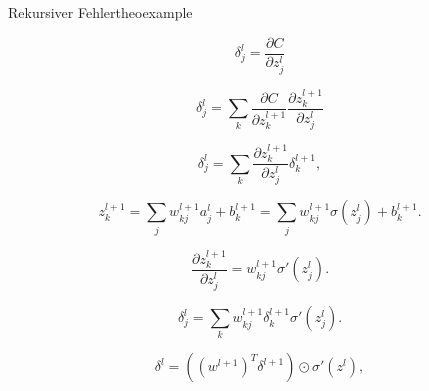 \begin{myderivation}{Rekursiver Fehler}{theoexample} \label{deri:grad}

\begin{equation} \label{eq:recErr1}
\delta^l_j = \frac{\partial C}{\partial z^l_j}
\end{equation}

\begin{equation} \label{eq:recErr2}
\delta^l_j = \sum_k \frac{\partial C}{\partial z^{l+1}_k} \frac{\partial z^{l+1}_k}{\partial z^l_j}
\end{equation}

\begin{equation} \label{eq:recErr3}
\delta^l_j = \sum_k \frac{\partial z^{l+1}_k}{\partial z^l_j} \delta^{l+1}_k,
\end{equation}

\begin{equation} \label{eq:recErr4}
z^{l+1}_k = \sum_j w^{l+1}_{kj} a^l_j +b^{l+1}_k = \sum_j w^{l+1}_{kj} \sigma(z^l_j) +b^{l+1}_k.
\end{equation}

\begin{equation} \label{eq:recErr5}
\frac{\partial z^{l+1}_k}{\partial z^l_j} = w^{l+1}_{kj} \sigma'(z^l_j).
\end{equation}

\begin{equation} \label{eq:recErr6}
\delta^l_j = \sum_k w^{l+1}_{kj}  \delta^{l+1}_k \sigma'(z^l_j).
\end{equation}

\begin{equation} \label{eq:recErr7}
\delta^l = ((w^{l+1})^T \delta^{l+1}) \odot \sigma'(z^l),
\end{equation}

\end{myderivation}



